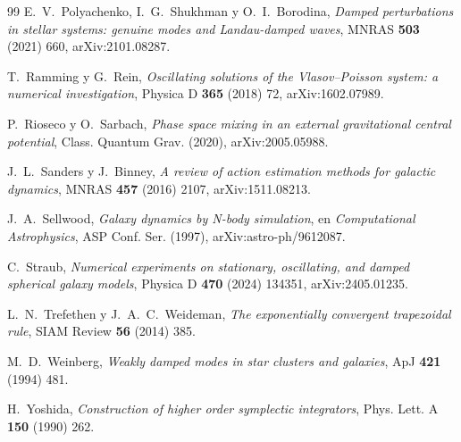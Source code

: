 \documentclass[11pt,a4paper]{article}
\begin{document}
\begin{thebibliography}{99}
E.~V.~Polyachenko, I.~G.~Shukhman y O.~I.~Borodina, \emph{Damped perturbations in stellar
systems: genuine modes and Landau-damped waves}, MNRAS \textbf{503} (2021) 660,
arXiv:2101.08287.

T.~Ramming y G.~Rein, \emph{Oscillating solutions of the Vlasov--Poisson system: a
numerical investigation}, Physica D \textbf{365} (2018) 72, arXiv:1602.07989.

P.~Rioseco y O.~Sarbach, \emph{Phase space mixing in an external gravitational central
potential}, Class. Quantum Grav. (2020), arXiv:2005.05988.

J.~L.~Sanders y J.~Binney, \emph{A review of action estimation methods for galactic
dynamics}, MNRAS \textbf{457} (2016) 2107, arXiv:1511.08213.

J.~A.~Sellwood, \emph{Galaxy dynamics by N-body simulation}, en \emph{Computational
Astrophysics}, ASP Conf. Ser. (1997), arXiv:astro-ph/9612087.

C.~Straub, \emph{Numerical experiments on stationary, oscillating, and damped spherical
galaxy models}, Physica D \textbf{470} (2024) 134351, arXiv:2405.01235.

L.~N.~Trefethen y J.~A.~C.~Weideman, \emph{The exponentially convergent trapezoidal
rule}, SIAM Review \textbf{56} (2014) 385.

M.~D.~Weinberg, \emph{Weakly damped modes in star clusters and galaxies}, ApJ
\textbf{421} (1994) 481.

H.~Yoshida, \emph{Construction of higher order symplectic integrators}, Phys. Lett. A
\textbf{150} (1990) 262.

\end{thebibliography}
\end{document}
